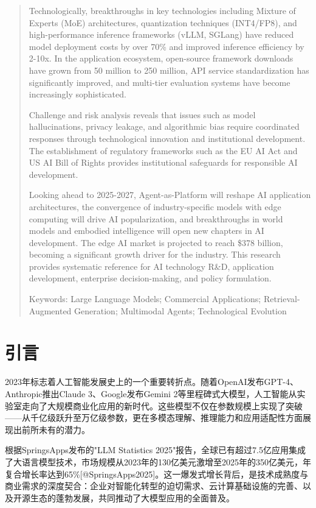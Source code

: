 \documentclass{article}
\begin{document}
\begin{abstract}
  Technologically, breakthroughs in key technologies including Mixture of Experts (MoE) architectures, quantization techniques (INT4/FP8), and high-performance inference frameworks (vLLM, SGLang) have reduced model deployment costs by over 70\% and improved inference efficiency by 2-10x. In the application ecosystem, open-source framework downloads have grown from 50 million to 250 million, API service standardization has significantly improved, and multi-tier evaluation systems have become increasingly sophisticated.

  Challenge and risk analysis reveals that issues such as model hallucinations, privacy leakage, and algorithmic bias require coordinated responses through technological innovation and institutional development. The establishment of regulatory frameworks such as the EU AI Act and US AI Bill of Rights provides institutional safeguards for responsible AI development.

  Looking ahead to 2025-2027, Agent-as-Platform will reshape AI application architectures, the convergence of industry-specific models with edge computing will drive AI popularization, and breakthroughs in world models and embodied intelligence will open new chapters in AI development. The edge AI market is projected to reach \$378 billion, becoming a significant growth driver for the industry. This research provides systematic reference for AI technology R\&D, application development, enterprise decision-making, and policy formulation.

  Keywords: Large Language Models; Commercial Applications; Retrieval-Augmented Generation; Multimodal Agents; Technological Evolution
\end{abstract}


\section{引言}
2023年标志着人工智能发展史上的一个重要转折点。随着OpenAI发布GPT-4、Anthropic推出Claude 3、Google发布Gemini 2等里程碑式大模型，人工智能从实验室走向了大规模商业化应用的新时代。这些模型不仅在参数规模上实现了突破——从千亿级跃升至万亿级参数，更在多模态理解、推理能力和应用适配性方面展现出前所未有的潜力。

根据SpringsApps发布的"LLM Statistics 2025"报告，全球已有超过7.5亿应用集成了大语言模型技术，市场规模从2023年的130亿美元激增至2025年的350亿美元，年复合增长率达到65\%[@SpringsApps2025]。这一爆发式增长背后，是技术成熟度与商业需求的深度契合：企业对智能化转型的迫切需求、云计算基础设施的完善、以及开源生态的蓬勃发展，共同推动了大模型应用的全面普及。
\end{document}

